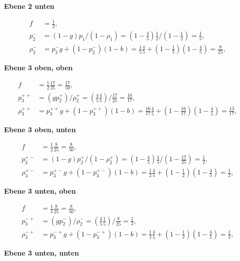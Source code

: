 \documentclass[fleqn]{article}
\begin{document}
\begin{enumerate}[a)]
\textbf{Ebene 2 unten}

$$
\begin{aligned}
    f&=\frac{1}{2},\\
    p_{2}^{-}&=(1-g) p_1 / (1- \rho_1) = \left(1-\frac{4}{5}\right) \frac{1}{2} / \left(1 -\frac{1}{2}\right) = \frac{1}{5}, \\
    \rho_{2}^{-}&= p_{2}^{-} g+\left(1-p_{2}^{-}\right)(1-b) = \frac{1}{5} \frac{4}{5}+\left(1- \frac{1}{5}\right) \left(1- \frac{4}{5}\right)=\frac{8}{25},
\end{aligned}
$$

\textbf{Ebene 3 oben, oben}

$$
\begin{aligned}
    f&=\frac{1}{2} \frac{17}{25} = \frac{17}{50},\\
    p_{3}^{++}&=(g p_2^{+})/ \rho_2^{+} = \left(\frac{4}{5} \frac{4}{5}\right) / \frac{17}{25} = \frac{16}{17}, \\
    \rho_{3}^{++}&= p_{3}^{++} g+\left(1-p_{3}^{++}\right)(1-b) = \frac{16}{17} \frac{4}{5}+\left(1- \frac{16}{17}\right) \left(1- \frac{4}{5}\right)=\frac{13}{17},
\end{aligned}
$$

\textbf{Ebene 3 oben, unten}

$$
\begin{aligned}
    f&=\frac{1}{2} \frac{8}{25} = \frac{8}{50} ,\\
    p_{3}^{+-}&=(1-g) p_2^{+} / (1- \rho_2^{+}) = \left(1-\frac{4}{5}\right) \frac{4}{5} / \left(1 -\frac{17}{25}\right) = \frac{1}{2}, \\
    \rho_{3}^{+-}&= p_{3}^{+-} g+\left(1-p_{3}^{+-}\right)(1-b) = \frac{1}{2} \frac{4}{5}+\left(1- \frac{1}{2}\right) \left(1- \frac{4}{5}\right)=\frac{1}{2},
\end{aligned}
$$

\textbf{Ebene 3 unten, oben}

$$
\begin{aligned}
    f&=\frac{1}{2} \frac{8}{25} = \frac{8}{50},\\
    p_{3}^{-+}&=(g p_2^{-})/ \rho_2^{-} = \left(\frac{4}{5} \frac{1}{5}\right) / \frac{8}{25} = \frac{1}{2}, \\
    \rho_{3}^{-+}&= p_{3}^{-+} g+\left(1-p_{3}^{-+}\right)(1-b) = \frac{1}{2} \frac{4}{5}+\left(1- \frac{1}{2}\right) \left(1- \frac{4}{5}\right)=\frac{1}{2},
\end{aligned}
$$

\textbf{Ebene 3 unten, unten}


\end{enumerate}
\end{document}
